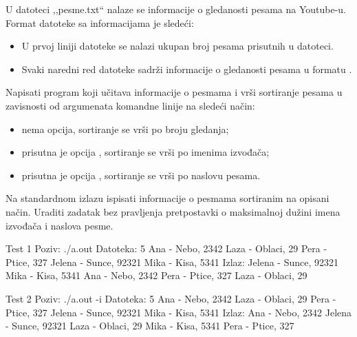 \begin{Answer}[ref=513]
\end{Answer}
\begin{Exercise}[label=514]
U datoteci ,,pesme.txt`` nalaze se informacije o gledanosti pesama na
Youtube-u. Format datoteke sa informacijama je sledeći:
\begin{itemize}
\item U prvoj liniji datoteke se nalazi ukupan broj pesama prisutnih u
  datoteci.
\item Svaki naredni red datoteke sadrži informacije o gledanosti
  pesama u formatu .
\end{itemize}
Napisati program koji učitava informacije o pesmama i vrši sortiranje
pesama u zavisnosti od argumenata komandne linije na sledeći način:
\begin{itemize}
\item nema opcija, sortiranje se vrši po broju gledanja;
\item prisutna je opcija , sortiranje se vrši po imenima
  izvođača;
\item prisutna je opcija , sortiranje se vrši po naslovu
  pesama.
\end{itemize}
Na standardnom izlazu ispisati informacije o pesmama sortiranim na opisani
način. Uraditi zadatak bez pravljenja pretpostavki o maksimalnoj dužini
  imena izvođača i naslova pesme.

\begin{miditest}
\begin{test}{Test 1}
Poziv: ./a.out
Datoteka:  5
           Ana - Nebo, 2342
           Laza - Oblaci, 29
           Pera - Ptice, 327
           Jelena - Sunce, 92321
           Mika - Kisa, 5341
Izlaz:     Jelena - Sunce, 92321
           Mika - Kisa, 5341
           Ana - Nebo, 2342
           Pera - Ptice, 327
           Laza - Oblaci, 29
\end{test}
\end{miditest}
\begin{miditest}
\begin{test}{Test 2}
Poziv: ./a.out -i
Datoteka:  5
           Ana - Nebo, 2342
           Laza - Oblaci, 29
           Pera - Ptice, 327
           Jelena - Sunce, 92321
           Mika - Kisa, 5341
Izlaz:     Ana - Nebo, 2342
           Jelena - Sunce, 92321
           Laza - Oblaci, 29
           Mika - Kisa, 5341
           Pera - Ptice, 327
\end{test}
\end{miditest}


\end{Exercise}
